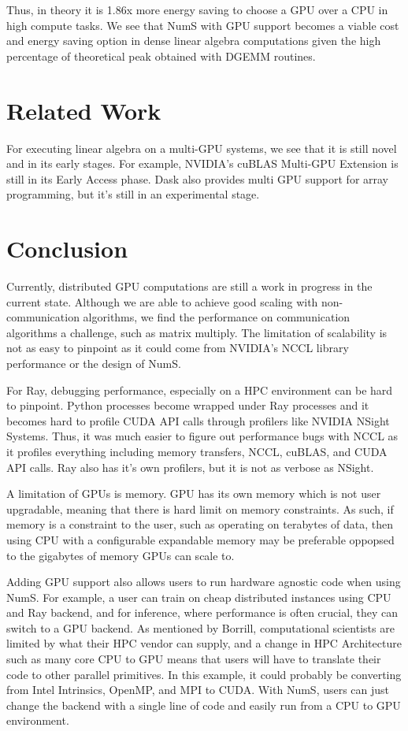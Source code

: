 \documentclass{article}
\begin{document}
Thus, in theory it is 1.86x more energy saving to choose a GPU over a CPU in high compute tasks. We see that NumS with GPU support becomes a viable cost and energy saving option in dense linear algebra computations given the high percentage of theoretical peak obtained with DGEMM routines.

\section{Related Work}
For executing linear algebra on a multi-GPU systems, we see that it is still novel and in its early stages. For example, NVIDIA's cuBLAS Multi-GPU Extension is still in its Early Access phase. \cite{cublasmg} Dask also provides multi GPU support for array programming, but it's still in an experimental stage. \cite{dask-cuda}

\section{Conclusion}
Currently, distributed GPU computations are still a work in progress in the current state. Although we are able to achieve good scaling with non-communication algorithms, we find the performance on communication algorithms a challenge, such as matrix multiply. The limitation of scalability is not as easy to pinpoint as it could come from NVIDIA's NCCL library performance or the design of NumS.

For Ray, debugging performance, especially on a HPC environment can be hard to pinpoint. Python processes become wrapped under Ray processes and it becomes hard to profile CUDA API calls through profilers like NVIDIA NSight Systems. Thus, it was much easier to figure out performance bugs with NCCL as it profiles everything including memory transfers, NCCL, cuBLAS, and CUDA API calls. Ray also has it's own profilers, but it is not as verbose as NSight.

A limitation of GPUs is memory. GPU has its own memory which is not user upgradable, meaning that there is hard limit on memory constraints. As such, if memory is a constraint to the user, such as operating on terabytes of data, then using CPU with a configurable expandable memory may be preferable oppopsed to the gigabytes of memory GPUs can scale to.

Adding GPU support also allows users to run hardware agnostic code when using NumS. For example, a user can train on cheap distributed instances using CPU and Ray backend, and for inference, where performance is often crucial, they can switch to a GPU backend. As mentioned by Borrill, computational scientists are limited by what their HPC vendor can supply, and a change in HPC Architecture such as many core CPU to GPU means that users will have to translate their code to other parallel primitives. \cite{borrill} In this example, it could probably be converting from Intel Intrinsics, OpenMP, and MPI to CUDA. With NumS, users can just change the backend with a single line of code and easily run from a CPU to GPU environment.
\end{document}
